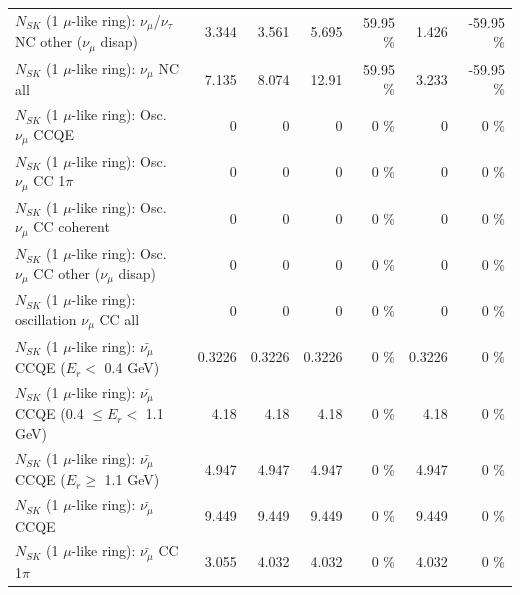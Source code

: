 \begin{table}
\begin{tabular}{| l | r | r | r  r | r  r |}
   $N_{SK}$ (1 $\mu$-like ring): $\nu_\mu$/$\nu_\tau$ NC other ($\nu_\mu$ disap) &           3.344 &           3.561 &           5.695 &    59.95 \%  &           1.426 &   -59.95 \%  \\ 
                                $N_{SK}$ (1 $\mu$-like ring): $\nu_{\mu}$ NC all &           7.135 &           8.074 &           12.91 &    59.95 \%  &           3.233 &   -59.95 \%  \\ 
\hline
\hline
                               $N_{SK}$ (1 $\mu$-like ring): Osc. $\nu_\mu$ CCQE &               0 &               0 &               0 &        0 \%  &               0 &        0 \%  \\ 
                          $N_{SK}$ (1 $\mu$-like ring): Osc. $\nu_\mu$ CC 1$\pi$ &               0 &               0 &               0 &        0 \%  &               0 &        0 \%  \\ 
                        $N_{SK}$ (1 $\mu$-like ring): Osc. $\nu_\mu$ CC coherent &               0 &               0 &               0 &        0 \%  &               0 &        0 \%  \\ 
         $N_{SK}$ (1 $\mu$-like ring): Osc. $\nu_\mu$ CC other ($\nu_\mu$ disap) &               0 &               0 &               0 &        0 \%  &               0 &        0 \%  \\ 
                      $N_{SK}$ (1 $\mu$-like ring): oscillation $\nu_\mu$ CC all &               0 &               0 &               0 &        0 \%  &               0 &        0 \%  \\ 
\hline
\hline
          $N_{SK}$ (1 $\mu$-like ring): $\bar{\nu_\mu}$ CCQE ($E_{r} <$ 0.4 GeV) &          0.3226 &          0.3226 &          0.3226 &        0 \%  &          0.3226 &        0 \%  \\ 
 $N_{SK}$ (1 $\mu$-like ring): $\bar{\nu_\mu}$ CCQE (0.4 $\leq E_{r} <$ 1.1 GeV) &            4.18 &            4.18 &            4.18 &        0 \%  &            4.18 &        0 \%  \\ 
       $N_{SK}$ (1 $\mu$-like ring): $\bar{\nu_\mu}$ CCQE ($E_{r} \geq$ 1.1 GeV) &           4.947 &           4.947 &           4.947 &        0 \%  &           4.947 &        0 \%  \\ 
\hline
                              $N_{SK}$ (1 $\mu$-like ring): $\bar{\nu_\mu}$ CCQE &           9.449 &           9.449 &           9.449 &        0 \%  &           9.449 &        0 \%  \\ 
                         $N_{SK}$ (1 $\mu$-like ring): $\bar{\nu_\mu}$ CC 1$\pi$ &           3.055 &           4.032 &           4.032 &        0 \%  &           4.032 &        0 \%  \\ 

\end{tabular}
\end{table}
